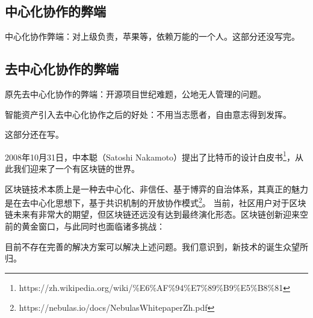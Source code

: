 \subsection{中心化协作的弊端}

中心化协作弊端：对上级负责，苹果等，依赖万能的一个人。这部分还没写完。

\subsection{去中心化协作的弊端}

原先去中心化协作的弊端：开源项目世纪难题，公地无人管理的问题。

智能资产引入去中心化协作之后的好处：不用当志愿者，自由意志得到发挥。

这部分还在写。

2008年10⽉31⽇，中本聪（Satoshi Nakamoto）提出了⽐特币的设计⽩皮书\footnote{https://zh.wikipedia.org/wiki/\%E6\%AF\%94\%E7\%89\%B9\%E5\%B8\%81}，从此我们迎来了一个有区块链的世界。

区块链技术本质上是⼀种去中心化、⾮信任、基于博弈的⾃治体系，其真正的魅力是在去中⼼化思想下，基于共识机制的开放协作模式\footnote{https://nebulas.io/docs/NebulasWhitepaperZh.pdf}。
当前，社区⽤户对于区块链未来有⾮常大的期望，但区块链还远没有达到最终演化形态。区块链创新迎来空前的黄金窗口，与此同时也面临诸多挑战：


目前不存在完善的解决方案可以解决上述问题。我们意识到，新技术的诞生众望所归。

